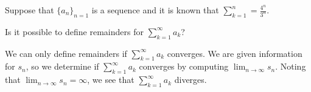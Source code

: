\documentclass{ximera}
\author{Jim Talamo}
\begin{document}
\begin{exercise}

Suppose that $\{a_n\}_{n=1}$ is a sequence and it is known that $\sum_{k=1}^n = \frac{4^n}{3^n}$.

Is it possible to define remainders for $\sum_{k=1}^{\infty} a_k$?

\begin{multipleChoice}
\end{multipleChoice}

\begin{feedback}
We can only define remainders if $\sum_{k=1}^{\infty} a_k$ converges.  We are given information for $s_n$, so we determine  if $\sum_{k=1}^{\infty} a_k$ converges by computing $\lim_{n \to \infty} s_n$.  Noting that $\lim_{n \to \infty} s_n = \infty$, we see that  $\sum_{k=1}^{\infty} a_k$ diverges.
\end{feedback}

\end{exercise}
\end{document}
